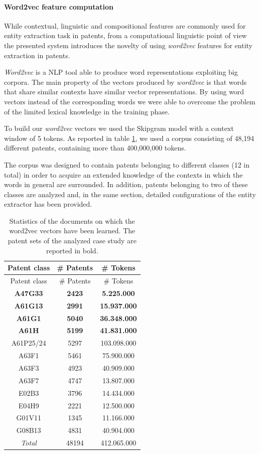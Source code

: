 \documentclass[]{book}
\let\oldparagraph\paragraph
\renewcommand{\paragraph}[1]{\oldparagraph{#1}\mbox{}}
\begin{document}
\paragraph{Word2vec feature
computation}\label{word2vec-feature-computation}

While contextual, linguistic and compositional features are commonly
used for entity extraction task in patents, from a computational
linguistic point of view the presented system introduces the novelty of
using \emph{word2vec} features for entity extraction in patents.

\emph{Word2vec} is a NLP tool able to produce word representations
exploiting big corpora. The main property of the vectors produced by
\emph{word2vec} is that words that share similar contexts have similar
vector representations. By using word vectors instead of the
corresponding words we were able to overcome the problem of the limited
lexical knowledge in the training phase.

To build our \emph{word2vec} vectors we used the Skipgram model with a
context window of 5 tokens. As reported in table
\ref{tab:word2vecpatents}, we used a corpus consisting of 48,194
different patents, containing more than 400,000,000 tokens.

The corpus was designed to contain patents belonging to different
classes (12 in total) in order to acquire an extended knowledge of the
contexts in which the words in general are surrounded. In addition,
patents belonging to two of these classes are analyzed and, in the same
section, detailed configurations of the entity extractor has been
provided.

\begin{longtable}[]{@{}ccc@{}}
\caption{\label{tab:word2vecpatents} Statistics of the documents on which
the word2vec vectors have been learned. The patent sets of the analyzed
case study are reported in bold.}\tabularnewline
\toprule
Patent class & \# Patents & \# Tokens\tabularnewline
\midrule
\endfirsthead
\toprule
Patent class & \# Patents & \# Tokens\tabularnewline
\midrule
\endhead
\textbf{A47G33} & \textbf{2423} & \textbf{5.225.000}\tabularnewline
\textbf{A61G13} & \textbf{2991} & \textbf{15.937.000}\tabularnewline
\textbf{A61G1} & \textbf{5040} & \textbf{36.348.000}\tabularnewline
\textbf{A61H} & \textbf{5199} & \textbf{41.831.000}\tabularnewline
A61P25/24 & 5297 & 103.098.000\tabularnewline
A63F1 & 5461 & 75.900.000\tabularnewline
A63F3 & 4923 & 40.909.000\tabularnewline
A63F7 & 4747 & 13.807.000\tabularnewline
E02B3 & 3796 & 14.434.000\tabularnewline
E04H9 & 2221 & 12.500.000\tabularnewline
G01V11 & 1345 & 11.166.000\tabularnewline
G08B13 & 4831 & 40.904.000\tabularnewline
\emph{Total} & 48194 & 412.065.000\tabularnewline
\bottomrule
\end{longtable}
\end{document}
